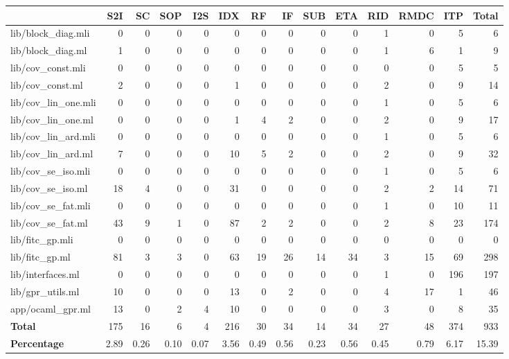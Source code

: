 \begin{tabular}{lrrrrrrrrrrrrr}
  \hline
  & S2I & SC & SOP & I2S & IDX & RF & IF & SUB & ETA & RID & RMDC & ITP & \textbf{Total} \\
  \hline
  lib/block\_diag.mli & 0 & 0 & 0 & 0 & 0 & 0 & 0 & 0 & 0 & 1 & 0 & 5 & 6 \\
  lib/block\_diag.ml & 1 & 0 & 0 & 0 & 0 & 0 & 0 & 0 & 0 & 1 & 6 & 1 & 9 \\
  lib/cov\_const.mli & 0 & 0 & 0 & 0 & 0 & 0 & 0 & 0 & 0 & 0 & 0 & 5 & 5 \\
  lib/cov\_const.ml & 2 & 0 & 0 & 0 & 1 & 0 & 0 & 0 & 0 & 2 & 0 & 9 & 14 \\
  lib/cov\_lin\_one.mli & 0 & 0 & 0 & 0 & 0 & 0 & 0 & 0 & 0 & 1 & 0 & 5 & 6 \\
  lib/cov\_lin\_one.ml & 0 & 0 & 0 & 0 & 1 & 4 & 2 & 0 & 0 & 2 & 0 & 9 & 17 \\
  lib/cov\_lin\_ard.mli & 0 & 0 & 0 & 0 & 0 & 0 & 0 & 0 & 0 & 1 & 0 & 5 & 6 \\
  lib/cov\_lin\_ard.ml & 7 & 0 & 0 & 0 & 10 & 5 & 2 & 0 & 0 & 2 & 0 & 9 & 32 \\
  lib/cov\_se\_iso.mli & 0 & 0 & 0 & 0 & 0 & 0 & 0 & 0 & 0 & 1 & 0 & 5 & 6 \\
  lib/cov\_se\_iso.ml & 18 & 4 & 0 & 0 & 31 & 0 & 0 & 0 & 0 & 2 & 2 & 14 & 71 \\
  lib/cov\_se\_fat.mli & 0 & 0 & 0 & 0 & 0 & 0 & 0 & 0 & 0 & 1 & 0 & 10 & 11 \\
  lib/cov\_se\_fat.ml & 43 & 9 & 1 & 0 & 87 & 2 & 2 & 0 & 0 & 2 & 8 & 23 & 174 \\
  lib/fitc\_gp.mli & 0 & 0 & 0 & 0 & 0 & 0 & 0 & 0 & 0 & 0 & 0 & 0 & 0 \\
  lib/fitc\_gp.ml & 81 & 3 & 3 & 0 & 63 & 19 & 26 & 14 & 34 & 3 & 15 & 69 & 298 \\
  lib/interfaces.ml & 0 & 0 & 0 & 0 & 0 & 0 & 0 & 0 & 0 & 1 & 0 & 196 & 197 \\
  lib/gpr\_utils.ml & 10 & 0 & 0 & 0 & 13 & 0 & 2 & 0 & 0 & 4 & 17 & 1 & 46 \\
  app/ocaml\_gpr.ml & 13 & 0 & 2 & 4 & 10 & 0 & 0 & 0 & 0 & 3 & 0 & 8 & 35 \\
  \hline
  \textbf{Total} & 175 & 16 & 6 & 4 & 216 & 30 & 34 & 14 & 34 & 27 & 48 & 374 & 933 \\
  \textbf{Percentage} & 2.89 & 0.26 & 0.10 & 0.07 & 3.56 & 0.49 & 0.56 & 0.23 & 0.56 & 0.45 & 0.79 & 6.17 & 15.39 \\
  \hline
  \end{tabular}
